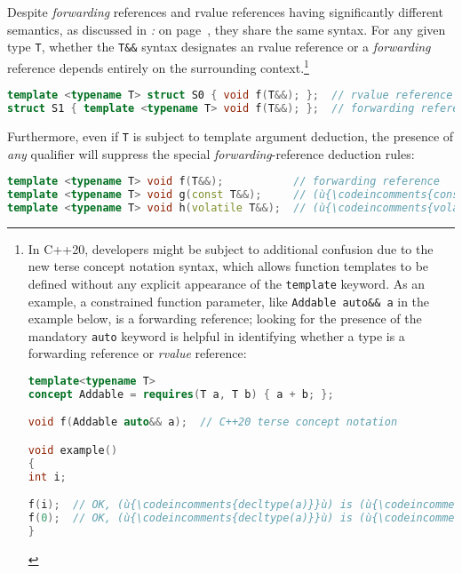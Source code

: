 Despite \emph{forwarding} references and rvalue
references having significantly different semantics, as discussed in \textit{: } on page~\pageref{identifying-forwarding-references}, they share the same syntax. For any given type \texttt{T},
whether the \texttt{T\&\&} syntax designates an rvalue
reference or a \emph{forwarding} reference depends entirely on the
surrounding context.{\cprotect\footnote{In C++20, developers might be
subject to additional confusion due to the new terse concept notation
syntax, which allows function templates to be defined without any
explicit appearance of the \texttt{template} keyword. As an example, a
constrained function parameter, like
\texttt{Addable}~\texttt{auto\&\&}~\texttt{a} in the example below, is a forwarding
reference; looking for the presence of the mandatory \texttt{auto}
keyword is helpful in identifying whether a type is a forwarding
reference or \emph{rvalue} reference:

\begin{lstlisting}[language=C++, basicstyle={\ttfamily\footnotesize}]
template<typename T>
concept Addable = requires(T a, T b) { a + b; };

void f(Addable auto&& a);  // C++20 terse concept notation

void example()
{
int i;

f(i);  // OK, (ù{\codeincomments{decltype(a)}}ù) is (ù{\codeincomments{int\&}}ù) in (ù{\codeincomments{f}}ù).
f(0);  // OK, (ù{\codeincomments{decltype(a)}}ù) is (ù{\codeincomments{int\&\&}}ù) in (ù{\codeincomments{f}}ù).
}
\end{lstlisting}
}}

\begin{lstlisting}[language=C++]
template <typename T> struct S0 { void f(T&&); };  // rvalue reference
struct S1 { template <typename T> void f(T&&); };  // forwarding reference
\end{lstlisting}

\noindent Furthermore, even if \texttt{T} is subject to template argument
deduction, the presence of \emph{any} qualifier will suppress the
special \emph{forwarding}-reference deduction rules:

\begin{lstlisting}[language=C++]
template <typename T> void f(T&&);           // forwarding reference
template <typename T> void g(const T&&);     // (ù{\codeincomments{const}}ù) rvalue reference
template <typename T> void h(volatile T&&);  // (ù{\codeincomments{volatile}}ù) rvalue reference
\end{lstlisting}

